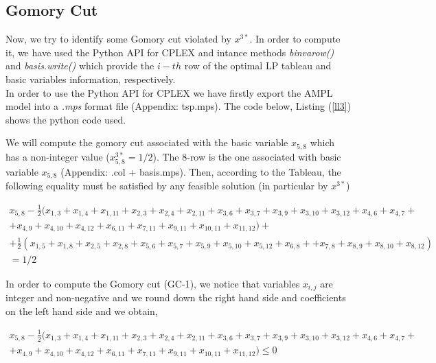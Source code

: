 \documentclass[12pt]{article}
\newenvironment{code}{\captionsetup{type=listing}}{}
\begin{document}
\subsection{Gomory Cut}
Now, we try to identify some Gomory cut violated by $x^{3*}$. In order to compute it, we have used the Python API for CPLEX and intance methods \textit{binvarow()} and \textit{basis.write()} which provide the $i-th$ row of the optimal LP tableau and basic variables information, respectively.\\

In order to use the Python API for CPLEX we have firstly export the AMPL model into a \textit{.mps} format file (Appendix: tsp.mps). The code below, Listing (\ref{ll3}) shows the python code used.

\begin{code}
\label{ll3}
\end{code}

We will compute the gomory cut associated with the basic variable $x_{5,8}$ which has a non-integer value ($x_{5,8}^{3*} = 1/2$). The $8$-row is the one associated with basic variable $x_{5,8}$ (Appendix: .col + basis.mps). Then, according to the Tableau, the following equality must be satisfied by any feasible solution (in particular by $x^{3*}$)

\begin{equation}
\begin{split}
    x_{5,8} -\frac{1}{2}(x_{1,3}+x_{1,4}+x_{1,11}+x_{2,3}+x_{2,4}+x_{2,11}+ x_{3,6}+x_{3,7}+x_{3,9}+x_{3,10}+x_{3,12}+x_{4,6}+x_{4,7}+\\+x_{4,9}+x_{4,10}+x_{4,12}+ x_{6,11}+x_{7,11}+x_{9,11}+x_{10,11}+x_{11,12}) +\\ +\frac{1}{2}(x_{1,5}+x_{1,8}+x_{2,5}+x_{2,8}+x_{5,6}+x_{5,7}+x_{5,9}+x_{5,10}+x_{5,12}+x_{6,8}++x_{7,8}+x_{8,9}+x_{8,10}+x_{8,12}) \\ = 1/2
\end{split}
\label{eq19}
\end{equation}

In order to compute the Gomory cut (GC-1), we notice that variables $x_{i,j}$ are integer and non-negative and we round down the right hand side and coefficients on the left hand side and we obtain,

\begin{equation}
\begin{split}
    x_{5,8} -\frac{1}{2}(x_{1,3}+x_{1,4}+x_{1,11}+x_{2,3}+x_{2,4}+x_{2,11}+ x_{3,6}+x_{3,7}+x_{3,9}+x_{3,10}+x_{3,12}+x_{4,6}+x_{4,7}+\\+x_{4,9}+x_{4,10}+x_{4,12}+
    x_{6,11}+x_{7,11}+x_{9,11}+x_{10,11}+x_{11,12}) \leq 0
\end{split}
\tag{GC-1}
\end{equation}
\end{document}
